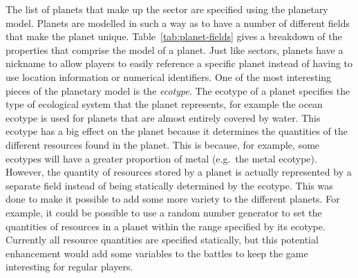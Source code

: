 The list of planets that make up the sector are specified using the planetary model. Planets are modelled in such a way as to have a number of different fields that make the planet unique. Table~\ref{tab:planet-fields} gives a breakdown of the properties that comprise the model of a planet. Just like sectors, planets have a nickname to allow players to easily reference a specific planet instead of having to use location information or numerical identifiers. One of the most interesting pieces of the planetary model is the \emph{ecotype}. The ecotype of a planet specifies the type of ecological system that the planet represents, for example the ocean ecotype is used for planets that are almost entirely covered by water. This ecotype has a big effect on the planet because it determines the quantities of the different resources found in the planet. This is because, for example, some ecotypes will have a greater proportion of metal (e.g.\ the metal ecotype). However, the quantity of resources stored by a planet is actually represented by a separate field instead of being statically determined by the ecotype. This was done to make it possible to add some more variety to the different planets. For example, it could be possible to use a random number generator to set the quantities of resources in a planet within the range specified by its ecotype. Currently all resource quantities are specified statically, but this potential enhancement would add some variables to the battles to keep the game interesting for regular players.

% 
% 



